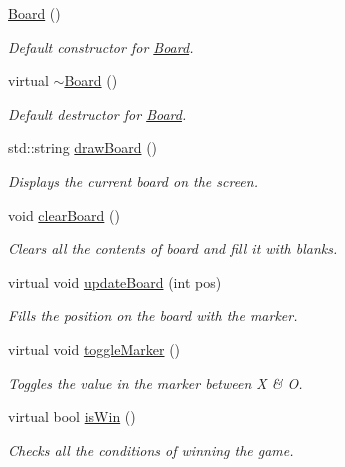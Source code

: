 \begin{DoxyCompactItemize}
\item 
\mbox{\hyperlink{classBoard_a9ee491d4fea680cf69b033374a9fdfcb}{Board}} ()
\begin{DoxyCompactList}\small\item\em Default constructor for \mbox{\hyperlink{classBoard}{Board}}. \end{DoxyCompactList}\item 
virtual \mbox{\hyperlink{classBoard_af73f45730119a1fd8f6670f53f959e68}{$\sim$\+Board}} ()
\begin{DoxyCompactList}\small\item\em Default destructor for \mbox{\hyperlink{classBoard}{Board}}. \end{DoxyCompactList}\item 
std\+::string \mbox{\hyperlink{classBoard_a8fb1cd277d1dd029baeda80ec8e65756}{draw\+Board}} ()
\begin{DoxyCompactList}\small\item\em Displays the current board on the screen. \end{DoxyCompactList}\item 
void \mbox{\hyperlink{classBoard_a5f148daa03da25d40dff3fc613568d6f}{clear\+Board}} ()
\begin{DoxyCompactList}\small\item\em Clears all the contents of board and fill it with blanks. \end{DoxyCompactList}\item 
virtual void \mbox{\hyperlink{classBoard_a44d5f45daeec9a19d48d17aa02601a17}{update\+Board}} (int pos)
\begin{DoxyCompactList}\small\item\em Fills the position on the board with the marker. \end{DoxyCompactList}\item 
virtual void \mbox{\hyperlink{classBoard_aca803d96c721292cedaf21b2ac5fb1a8}{toggle\+Marker}} ()
\begin{DoxyCompactList}\small\item\em Toggles the value in the marker between \textquotesingle{}X\textquotesingle{} \& \textquotesingle{}O\textquotesingle{}. \end{DoxyCompactList}\item 
virtual bool \mbox{\hyperlink{classBoard_ae59ed3d0322d92f9d9ae3ee6652e7268}{is\+Win}} ()
\begin{DoxyCompactList}\small\item\em Checks all the conditions of winning the game. \end{DoxyCompactList}\item 

\end{DoxyCompactItemize}
